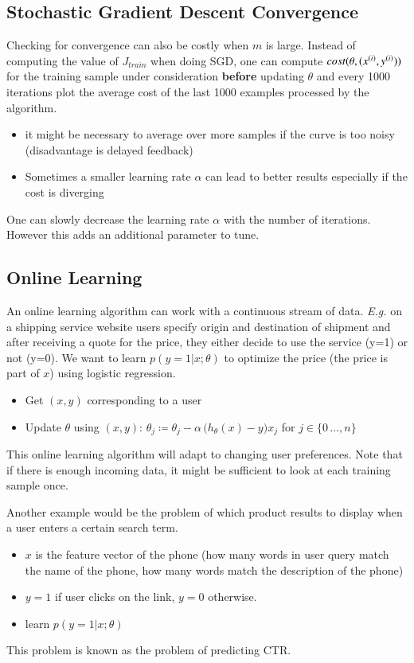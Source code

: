 \documentclass[a4paper,twoside,10pt]{article}
\begin{document}
\subsection{Stochastic Gradient Descent Convergence}
Checking for convergence can also be costly when $m$ is large.
Instead of computing the value of $J_{train}$ when doing \ac{SGD}, one can compute $cost(\theta,(x^{(i)},y^{(i)}))$ for the training sample under consideration \textbf{before} updating $\theta$ and every 1000 iterations plot the average cost of the last 1000 examples processed by the algorithm.
\begin{itemize}
  \item it might be necessary to average over more samples if the curve is too noisy (disadvantage is delayed feedback)
  \item Sometimes a smaller learning rate $\alpha$ can lead to better results especially if the cost is diverging
\end{itemize}
One can slowly decrease the learning rate $\alpha$ with the number of iterations. However this adds an additional parameter to tune.

\subsection{Online Learning}
An online learning algorithm can work with a continuous stream of data.
\emph{E.g.} on a shipping service website users specify origin and destination of shipment and after receiving a quote for the price, they either decide to use the service (y=1) or not (y=0). We want to learn $p(y=1|x;\theta)$ to optimize the price (the price is part of $x$) using logistic regression.
\begin{itemize}
  \item Get $(x,y)$ corresponding to a user
  \item Update $\theta$ using $(x,y)$: $\theta_j\coloneqq\theta_j-\alpha\,\big(h_\theta(x)-y)x_j$ for $j\in\{0\,\ldots,n\}$
\end{itemize}
This online learning algorithm will adapt to changing user preferences.
Note that if there is enough incoming data, it might be sufficient to look at each training sample once.

Another example would be the problem of which product results to display when a user enters a certain search term.
\begin{itemize}
  \item $x$ is the feature vector of the phone (how many words in user query match the name of the phone, how many words match the description of the phone)
  \item $y=1$ if user clicks on the link, $y=0$ otherwise.
  \item learn $p(y=1|x;\theta)$
\end{itemize}
This problem is known as the problem of predicting \ac{CTR}.
\end{document}
